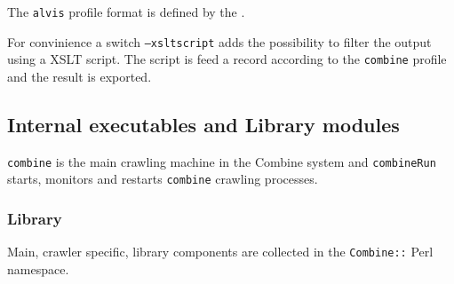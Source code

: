 The {\tt alvis} profile format is defined by the  .

For convinience a switch {\tt--xsltscript} adds the possibility
to filter the output using a XSLT script. The script is feed
a record according to the {\tt combine} profile and the result
is exported.
 
\subsection{Internal executables and Library modules}
{\tt combine} is the main crawling machine in the Combine system and 
{\tt combineRun} starts, monitors and restarts {\tt combine} crawling processes.

\subsubsection{Library}

Main, crawler specific, library components are collected in the {\tt Combine::} Perl namespace.